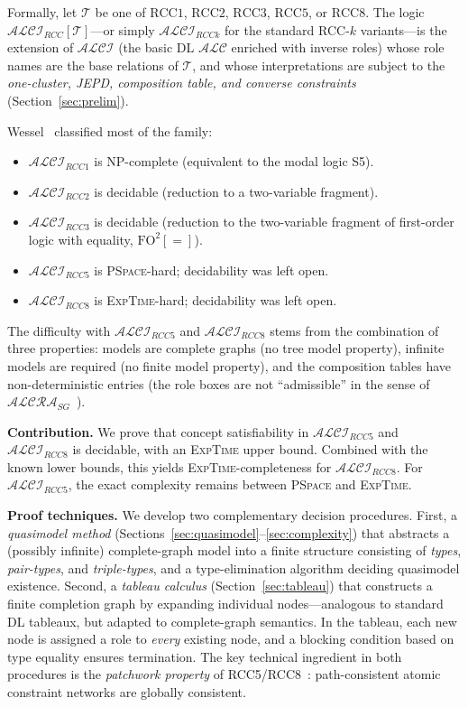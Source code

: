 \documentclass[a4paper,11pt]{article}
\theoremstyle{definition}
\newcommand{\ALC}{\ensuremath{\mathcal{ALC}}}
\newcommand{\ALCI}{\ensuremath{\mathcal{ALCI}}}
\newcommand{\ALCIRCC}[1]{\ensuremath{\mathcal{ALCI}_{\mathit{RCC#1}}}}
\newcommand{\ALCRASG}{\ensuremath{\mathcal{ALCRA}_{\mathit{SG}}}}
\newcommand{\EXPTIME}{\textsc{ExpTime}}
\newcommand{\PSPACE}{\textsc{PSpace}}
\newcommand{\NP}{\textsc{NP}}
\begin{document}
\smallskip
Formally, let $\mathcal{T}$ be one of $\mathrm{RCC1}$,
$\mathrm{RCC2}$, $\mathrm{RCC3}$, $\mathrm{RCC5}$, or
$\mathrm{RCC8}$.  The logic $\ALCIRCC{}[\mathcal{T}]$---or simply
$\ALCIRCC{k}$ for the standard RCC-$k$ variants---is the extension of
$\ALCI$ (the basic DL $\ALC$ enriched with inverse roles) whose role
names are the base relations of $\mathcal{T}$, and whose
interpretations are subject to the \emph{one-cluster, JEPD, composition
table, and converse constraints} (Section~\ref{sec:prelim}).

\smallskip
Wessel~\cite{Wessel2003} classified most of the family:
\begin{itemize}[nosep]
  \item $\ALCIRCC{1}$ is \NP-complete (equivalent to the modal logic S5).
  \item $\ALCIRCC{2}$ is decidable (reduction to a two-variable fragment).
  \item $\ALCIRCC{3}$ is decidable (reduction to the two-variable
    fragment of first-order logic with equality, $\mathrm{FO}^2[=]$).
  \item $\ALCIRCC{5}$ is \PSPACE-hard; decidability was left open.
  \item $\ALCIRCC{8}$ is \EXPTIME-hard; decidability was left open.
\end{itemize}

The difficulty with $\ALCIRCC{5}$ and $\ALCIRCC{8}$ stems from the
combination of three properties: models are complete graphs (no tree
model property), infinite models are required (no finite model
property), and the composition tables have non-deterministic entries
(the role boxes are not ``admissible'' in the sense of
$\ALCRASG$~\cite{Wessel2000}).

\smallskip
\textbf{Contribution.} We prove that concept satisfiability in
$\ALCIRCC{5}$ and $\ALCIRCC{8}$ is decidable, with an \EXPTIME{}
upper bound.  Combined with the known lower bounds, this yields
\EXPTIME-completeness for $\ALCIRCC{8}$.  For $\ALCIRCC{5}$, the
exact complexity remains between \PSPACE{} and \EXPTIME.

\smallskip
\textbf{Proof techniques.}  We develop two complementary decision
procedures.  First, a \emph{quasimodel method}
(Sections~\ref{sec:quasimodel}--\ref{sec:complexity}) that abstracts a
(possibly infinite) complete-graph model into a finite structure
consisting of \emph{types}, \emph{pair-types}, and
\emph{triple-types}, and a type-elimination algorithm deciding
quasimodel existence.  Second, a \emph{tableau calculus}
(Section~\ref{sec:tableau}) that constructs a finite completion graph
by expanding individual nodes---analogous to standard DL tableaux, but
adapted to complete-graph semantics.  In the tableau, each new node
is assigned a role to \emph{every} existing node, and a blocking
condition based on type equality ensures termination.  The key
technical ingredient in both procedures is the \emph{patchwork
property} of RCC5/RCC8~\cite{RenzNebel1999,Renz1999}: path-consistent
atomic constraint networks are globally consistent.
\end{document}
